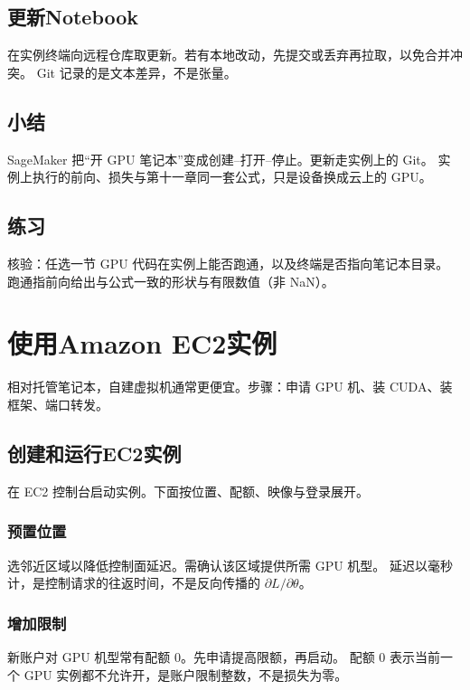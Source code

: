 \subsection{更新Notebook}

在实例终端向远程仓库取更新。若有本地改动，先提交或丢弃再拉取，以免合并冲突。
Git 记录的是文本差异，不是张量。

\subsection{小结}

SageMaker 把“开 GPU 笔记本”变成创建–打开–停止。更新走实例上的 Git。
实例上执行的前向、损失与第十一章同一套公式，只是设备换成云上的 GPU。

\subsection{练习}

核验：任选一节 GPU 代码在实例上能否跑通，以及终端是否指向笔记本目录。
跑通指前向给出与公式一致的形状与有限数值（非 NaN）。

\section{使用Amazon EC2实例}

相对托管笔记本，自建虚拟机通常更便宜。步骤：申请 GPU 机、装 CUDA、装框架、端口转发。

\subsection{创建和运行EC2实例}

在 EC2 控制台启动实例。下面按位置、配额、映像与登录展开。

\subsubsection{预置位置}

选邻近区域以降低控制面延迟。需确认该区域提供所需 GPU 机型。
延迟以毫秒计，是控制请求的往返时间，不是反向传播的 $\partial L/\partial\theta$。

\subsubsection{增加限制}

新账户对 GPU 机型常有配额 $0$。先申请提高限额，再启动。
配额 $0$ 表示当前一个 GPU 实例都不允许开，是账户限制整数，不是损失为零。

